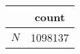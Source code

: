{
\def\sym#1{\ifmmode^{#1}\else\(^{#1}\)\fi}
\begin{tabular}{l*{1}{c}}
\hline\hline
            &       count\\
\hline
\hline
\(N\)       &     1098137\\
\hline\hline
\end{tabular}
}
